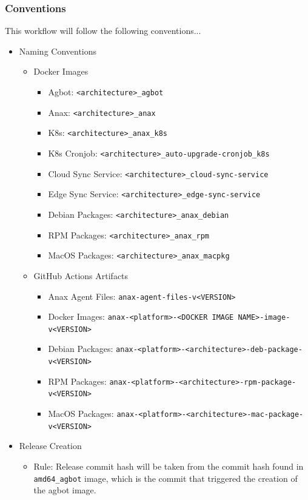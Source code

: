 \documentclass[a4paper,11pt]{article}
\begin{document}
\subsubsection{Conventions}
This workflow will follow the following conventions...
\begin{itemize}
    \item Naming Conventions
    \begin{itemize}
        \item Docker Images
        \begin{itemize}
            \item Agbot: \verb|<architecture>_agbot|
            \item Anax: \verb|<architecture>_anax|
            \item K8s: \verb|<architecture>_anax_k8s|
            \item K8s Cronjob: \verb|<architecture>_auto-upgrade-cronjob_k8s|
            \item Cloud Sync Service: \verb|<architecture>_cloud-sync-service|
            \item Edge Sync Service: \verb|<architecture>_edge-sync-service|
            \item Debian Packages: \verb|<architecture>_anax_debian|
            \item RPM Packages: \verb|<architecture>_anax_rpm|
            \item MacOS Packages: \verb|<architecture>_anax_macpkg|
        \end{itemize}
        \item GitHub Actions Artifacts
        \begin{itemize}
            \item Anax Agent Files: \verb|anax-agent-files-v<VERSION>|
            \item Docker Images: \verb|anax-<platform>-<DOCKER IMAGE NAME>-image-v<VERSION>|
            \item Debian Packages: \verb|anax-<platform>-<architecture>-deb-package-v<VERSION>|
            \item RPM Packages: \verb|anax-<platform>-<architecture>-rpm-package-v<VERSION>|
            \item MacOS Packages: \verb|anax-<platform>-<architecture>-mac-package-v<VERSION>|
        \end{itemize}
    \end{itemize}
    \item Release Creation
    \begin{itemize}
        \item Rule: Release commit hash will be taken from the commit hash found in \verb|amd64_agbot| image, which is the commit that triggered the creation of the agbot image.
    \end{itemize}
\end{itemize}
\end{document}
